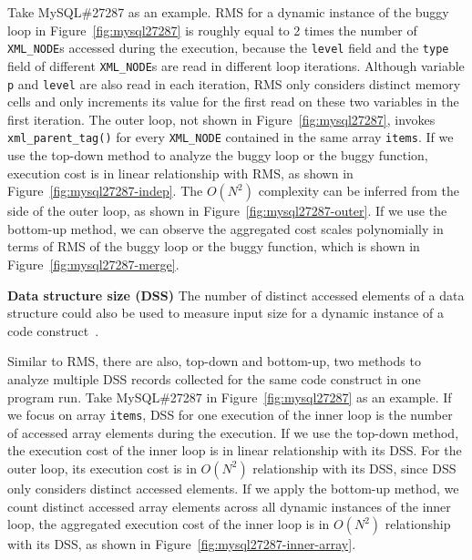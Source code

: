 Take MySQL\#27287 as an example.
RMS for a dynamic instance of
the buggy loop in Figure~\ref{fig:mysql27287}
is roughly equal to 2 times the number of \texttt{XML\_NODE}s 
accessed during the execution, 
because the \texttt{level} field and the \texttt{type} field of 
different \texttt{XML\_NODE}s are read in different loop iterations.
Although variable \texttt{p} and \texttt{level} are also read in each iteration,
RMS only considers distinct memory cells and 
only increments its value for the first read on these two variables in the first iteration. 
The outer loop, not shown in Figure~\ref{fig:mysql27287}, 
invokes \texttt{xml\_parent\_tag()} for every \texttt{XML\_NODE} contained
in the same array \texttt{items}.
If we use the top-down method to analyze the buggy loop
or the buggy function, 
execution cost is in linear relationship with RMS, 
as shown in Figure~\ref{fig:mysql27287-indep}.
The $O(N^2)$ complexity can be inferred from the side of the outer loop, 
as shown in Figure~\ref{fig:mysql27287-outer}. 
If we use the bottom-up method, 
we can observe the aggregated cost scales 
polynomially in terms of RMS of the buggy loop 
or the buggy function, 
which is shown in Figure~\ref{fig:mysql27287-merge}. 

\noindent\textbf{Data structure size (DSS)}
The number of distinct accessed elements of a data 
structure could also be used to measure 
input size for a dynamic instance of a code construct~\cite{AlgoProf}. 

Similar to RMS, there are also, top-down and bottom-up, 
two methods to analyze 
multiple DSS records collected for the same code 
construct in one program run.
Take MySQL\#27287 in Figure~\ref{fig:mysql27287} as an example.
If we focus on array \texttt{items},
DSS for one execution of the inner loop is the number of 
accessed array elements during the execution.
If we use the top-down method, the execution cost 
of the inner loop is in linear relationship with its DSS.
For the outer loop, its execution cost is in $O(N^2)$ relationship with its DSS,
since DSS only considers distinct accessed elements.
If we apply the bottom-up method, 
we count distinct accessed array elements across all dynamic instances of the inner loop,
the aggregated execution cost of the inner loop is in $O(N^2)$ relationship with its DSS, 
as shown in Figure~\ref{fig:mysql27287-inner-array}.   

